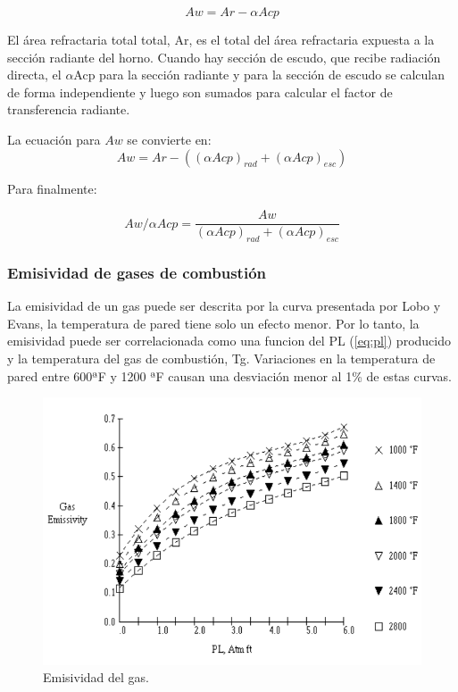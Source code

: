 \begin{equation}
Aw = Ar - \alpha Acp
\end{equation}

\par El área refractaria total total, Ar, es el total del área refractaria expuesta a la sección radiante del horno. Cuando hay sección de escudo, que recibe radiación directa, el $\alpha$Acp para la sección radiante y para la sección de escudo se calculan de forma independiente y luego son sumados para calcular el factor de transferencia radiante.

\par La ecuación para $Aw$ se convierte en:
\begin{equation}
Aw = Ar - ((\alpha Acp)_{rad} + (\alpha Acp)_{esc})   
\end{equation}

\par Para finalmente:

\begin{equation}
\label{eq:aw-acp}
Aw/\alpha Acp = \frac{Aw}{(\alpha Acp)_{rad} + (\alpha Acp)_{esc}}
\end{equation}
 
\subsubsection{Emisividad de gases de combustión}
\par La emisividad de un gas puede ser descrita por la curva presentada por Lobo y Evans\cite{bib:rad}, la temperatura de pared tiene solo un efecto menor. Por lo tanto, la emisividad puede ser correlacionada como una funcion del PL (\ref{eq:pl}) producido y la temperatura del gas de combustión, Tg. Variaciones en la temperatura de pared entre 600ªF y 1200 ªF causan una desviación menor al 1\% de estas curvas.

\begin{figure}[hbt]
\begin{center}
\includegraphics[scale=0.45]{images/emiss}
\caption[Emisividad del gas]{Emisividad del gas.}
\label{fig:emiss}
\end{center}
\end{figure}

